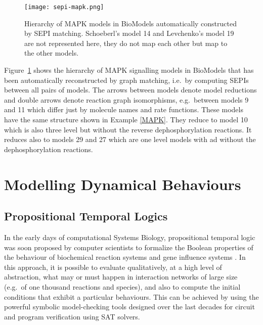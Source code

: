 \documentclass[graybox]{svmult}
\begin{document}
\begin{figure}[htb]
\begin{center}
\texttt{[image: sepi-mapk.png]}
\end{center}
\caption{Hierarchy of MAPK models in BioModels automatically constructed by SEPI matching.
Schoeberl's model 14 and Levchenko's model 19 are not represented here,
they do not map each other but map to the other models.}
\label{fig:mapk}
\end{figure}

Figure~\ref{fig:mapk} shows the hierarchy of MAPK signalling models
in BioModels that has been automatically reconstructed by graph matching, i.e.~by computing SEPIs between all pairs of models.
The arrows between models denote model reductions and double arrows denote reaction graph isomorphisms,
e.g.~between models 9 and 11 which differ just by molecule names and rate functions.
These models have the same structure shown in Example \ref{MAPK}.
They reduce to model 10 which is also three level but without the reverse dephosphorylation reactions.
It reduces also to models 29 and 27 which are one level models with ad without the dephosphorylation reactions.


\section{Modelling Dynamical Behaviours}\label{temporal}


\subsection{Propositional Temporal Logics}\label{CTL}

In the early days of computational Systems Biology, propositional temporal logic
was soon proposed by computer scientists to formalize the Boolean properties of the behaviour of
biochemical reaction systems 
\cite{EKLLMS02psb,CF03cmsb} and gene influence systems \cite{BCRG04jtb,BRdJ05bi}.
In this approach, it is possible to
evaluate qualitatively, at a high level of abstraction, what may or must  happen in interaction networks of large size (e.g.~of one thousand reactions and species),
and also to compute the initial conditions that exhibit a particular behaviours.
This can be achieved by using the powerful symbolic model-checking tools
designed over the last decades for circuit and program verification \cite{CGP99mit,CCGGPRST02cav}
using SAT solvers.
\end{document}
